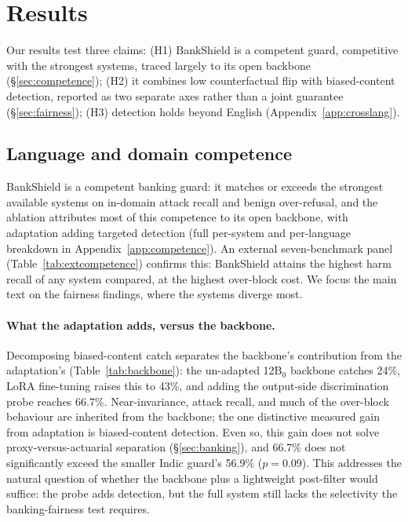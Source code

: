 \documentclass[11pt]{article}
\newcommand{\twelveB}{12B$_0$}
\begin{document}
\section{Results}
\label{sec:results}

Our results test three claims: (H1) BankShield is a competent guard, competitive with the strongest systems, traced largely to its open backbone (\S\ref{sec:competence}); (H2) it combines low counterfactual flip with biased-content detection, reported as two separate axes rather than a joint guarantee (\S\ref{sec:fairness}); (H3) detection holds beyond English (Appendix~\ref{app:crosslang}).

\subsection{Language and domain competence}
BankShield is a competent banking guard: it matches or exceeds the strongest available systems on in-domain attack recall and benign over-refusal, and the ablation attributes most of this competence to its open backbone, with adaptation adding targeted detection (full per-system and per-language breakdown in Appendix~\ref{app:competence}). An external seven-benchmark panel (Table~\ref{tab:extcompetence}) confirms this: BankShield attains the highest harm recall of any system compared, at the highest over-block cost. We focus the main text on the fairness findings, where the systems diverge most.

\paragraph{What the adaptation adds, versus the backbone.} Decomposing biased-content catch separates the backbone's contribution from the adaptation's (Table~\ref{tab:backbone}): the un-adapted \twelveB{} backbone catches 24\%, LoRA fine-tuning raises this to 43\%, and adding the output-side discrimination probe reaches 66.7\%. Near-invariance, attack recall, and much of the over-block behaviour are inherited from the backbone; the one distinctive measured gain from adaptation is biased-content detection. Even so, this gain does not solve proxy-versus-actuarial separation (\S\ref{sec:banking}), and 66.7\% does not significantly exceed the smaller Indic guard's 56.9\% ($p{=}0.09$). This addresses the natural question of whether the backbone plus a lightweight post-filter would suffice: the probe adds detection, but the full system still lacks the selectivity the banking-fairness test requires.
\end{document}
